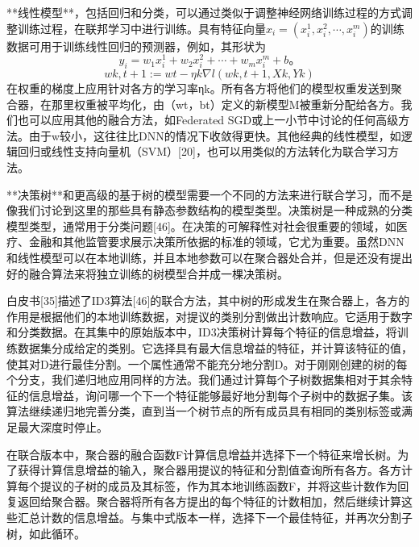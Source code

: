 **线性模型**，包括回归和分类，可以通过类似于调整神经网络训练过程的方式调整训练过程，在联邦学习中进行训练。具有特征向量$x_{i}=(x^{1}_{i}, x^{2}_{i}, \cdots, x^{m}_{i})$的训练数据可用于训练线性回归的预测器，例如，其形状为
$$
y_{i} = w_{1}x^{1}_{i} + w_{2}x^{2}_{i} + \cdots + w_{m}x^{m}_{i} + b。
$$
$$
wk,t+1:= wt− ηk\nabla l(wk,t+1, Xk, Yk)
$$
在权重的梯度上应用针对各方的学习率ηk。所有各方将他们的模型权重发送到聚合器，在那里权重被平均化，由（wt，bt）定义的新模型M被重新分配给各方。我们也可以应用其他的融合方法，如Federated SGD或上一小节中讨论的任何高级方法。由于w较小，这往往比DNN的情况下收敛得更快。其他经典的线性模型，如逻辑回归或线性支持向量机（SVM）[20]，也可以用类似的方法转化为联合学习方法。

**决策树**和更高级的基于树的模型需要一个不同的方法来进行联合学习，而不是像我们讨论到这里的那些具有静态参数结构的模型类型。决策树是一种成熟的分类模型类型，通常用于分类问题[46]。在决策的可解释性对社会很重要的领域，如医疗、金融和其他监管要求展示决策所依据的标准的领域，它尤为重要。虽然DNN和线性模型可以在本地训练，并且本地参数可以在聚合器处合并，但是还没有提出好的融合算法来将独立训练的树模型合并成一棵决策树。

白皮书[35]描述了ID3算法[46]的联合方法，其中树的形成发生在聚合器上，各方的作用是根据他们的本地训练数据，对提议的类别分割做出计数响应。它适用于数字和分类数据。在其集中的原始版本中，ID3决策树计算每个特征的信息增益，将训练数据集分成给定的类别。它选择具有最大信息增益的特征，并计算该特征的值，使其对D进行最佳分割。一个属性通常不能充分地分割D。对于刚刚创建的树的每个分支，我们递归地应用同样的方法。我们通过计算每个子树数据集相对于其余特征的信息增益，询问哪一个下一个特征能够最好地分割每个子树中的数据子集。该算法继续递归地完善分类，直到当一个树节点的所有成员具有相同的类别标签或满足最大深度时停止。

在联合版本中，聚合器的融合函数F计算信息增益并选择下一个特征来增长树。为了获得计算信息增益的输入，聚合器用提议的特征和分割值查询所有各方。各方计算每个提议的子树的成员及其标签，作为其本地训练函数F，并将这些计数作为回复返回给聚合器。聚合器将所有各方提出的每个特征的计数相加，然后继续计算这些汇总计数的信息增益。与集中式版本一样，选择下一个最佳特征，并再次分割子树，如此循环。

